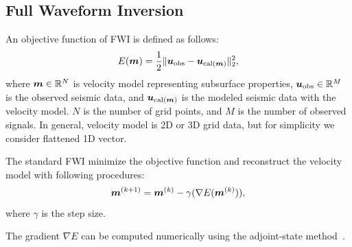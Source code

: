 \subsection{Full Waveform Inversion}\label{subsec:full-waveform-inversion}
An objective function of FWI is defined as follows\cite{FWI0}:
\begin{equation} \label{eq:FWIObjective} E(\bm{m}) = \frac {1} {2} \lVert  \bm{u}_{\mathrm{obs}} - \bm{u}_{\mathrm{cal}(\bm{m})}  \rVert _2^2, \end{equation}
where $\bm{m} \in \mathbb{R}^{N}$ is velocity model representing subsurface properties, $\bm{u}_{\mathrm{obs}} \in \mathbb{R}^{M}$ is the observed seismic data, and $\bm{u}_{\mathrm{cal}(\bm{m})}$ is the modeled seismic data with the velocity model.
$N$ is the number of grid points, and $M$ is the number of observed signals.
In general, velocity model is 2D or 3D grid data, but for simplicity we consider flattened 1D vector.

The standard FWI minimize the objective function and reconstruct the velocity model with following procedures:
\begin{equation} \label{eq:FWIWithGradient} \bm{m}^{(k+1)} = \bm{m}^{(k)} - \gamma( \nabla E(\bm{m}^{(k)}) ), \end{equation}
where $\gamma$ is the step size.

The gradient ${\nabla E}$ can be computed numerically using the adjoint-state method~\cite{FWI-gradient}.
